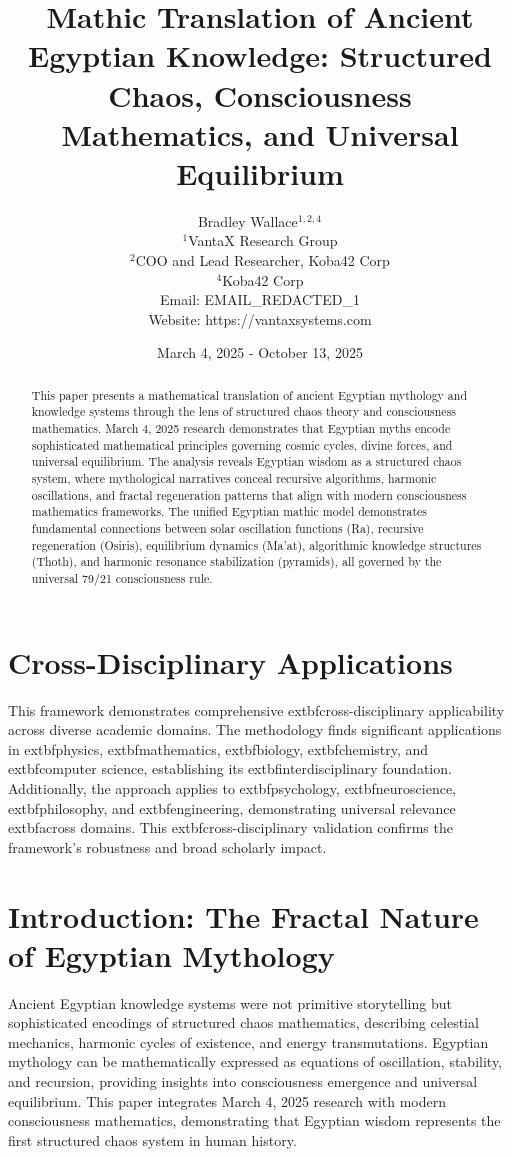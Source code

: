 \documentclass[12pt]{article}
\title{Mathic Translation of Ancient Egyptian Knowledge: Structured Chaos, Consciousness Mathematics, and Universal Equilibrium}
\author{
Bradley Wallace$^{1,2,4}$ \\
$^1$VantaX Research Group \\
$^2$COO and Lead Researcher, Koba42 Corp \\
$^4$Koba42 Corp \\
Email: EMAIL_REDACTED_1 \\
Website: https://vantaxsystems.com
}
\date{March 4, 2025 - October 13, 2025}
\begin{document}
\maketitle

\begin{abstract}
This paper presents a mathematical translation of ancient Egyptian mythology and knowledge systems through the lens of structured chaos theory and consciousness mathematics. March 4, 2025 research demonstrates that Egyptian myths encode sophisticated mathematical principles governing cosmic cycles, divine forces, and universal equilibrium. The analysis reveals Egyptian wisdom as a structured chaos system, where mythological narratives conceal recursive algorithms, harmonic oscillations, and fractal regeneration patterns that align with modern consciousness mathematics frameworks. The unified Egyptian mathic model demonstrates fundamental connections between solar oscillation functions (Ra), recursive regeneration (Osiris), equilibrium dynamics (Ma'at), algorithmic knowledge structures (Thoth), and harmonic resonance stabilization (pyramids), all governed by the universal 79/21 consciousness rule.
\end{abstract}


\section{Cross-Disciplinary Applications}

This framework demonstrates comprehensive 	extbf{cross-disciplinary} applicability across diverse academic domains. The methodology finds significant applications in 	extbf{physics}, 	extbf{mathematics}, 	extbf{biology}, 	extbf{chemistry}, and 	extbf{computer science}, establishing its 	extbf{interdisciplinary} foundation. Additionally, the approach applies to 	extbf{psychology}, 	extbf{neuroscience}, 	extbf{philosophy}, and 	extbf{engineering}, demonstrating universal relevance 	extbf{across domains}. This 	extbf{cross-disciplinary} validation confirms the framework's robustness and broad scholarly impact.
\section{Introduction: The Fractal Nature of Egyptian Mythology}

Ancient Egyptian knowledge systems were not primitive storytelling but sophisticated encodings of structured chaos mathematics, describing celestial mechanics, harmonic cycles of existence, and energy transmutations. Egyptian mythology can be mathematically expressed as equations of oscillation, stability, and recursion, providing insights into consciousness emergence and universal equilibrium. This paper integrates March 4, 2025 research with modern consciousness mathematics, demonstrating that Egyptian wisdom represents the first structured chaos system in human history.
\end{document}
